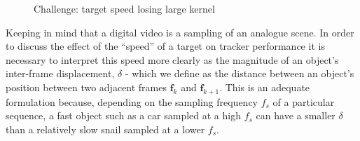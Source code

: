 \begin{figure}
    \caption{Challenge: target speed losing large kernel\label{fig_mean_shift_ant_speed2}}
\end{figure}

Keeping in mind that a digital video is a sampling of an analogue scene.
In order to discuss the effect of the ``speed'' of a target on tracker
performance it is necessary to interpret this speed more clearly
as the magnitude of an object's inter-frame displacement, $\delta$ - which
we define as the distance between an object's
position between two adjacent frames $\mathbf{f}_k$ and $\mathbf{f}_{k+1}$.
This is an adequate formulation because, depending on the sampling frequency $f_s$ of
a particular sequence, a fast object such as a car sampled at a high $f_s$ can
have a smaller $\delta$ than a relatively slow snail sampled at a lower $f_s$. 

